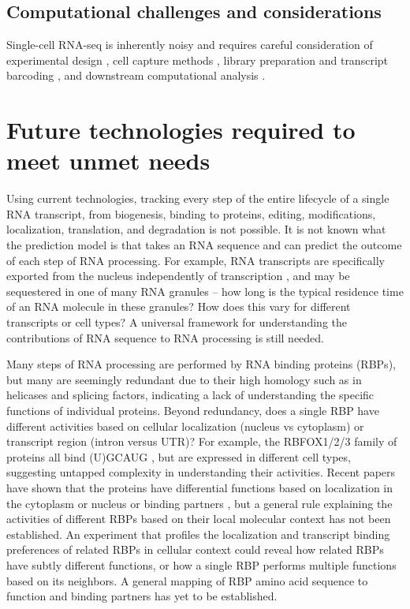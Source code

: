 \subsection{Computational challenges and considerations}

Single-cell RNA-seq is inherently noisy and requires careful consideration of experimental design \cite{Bacher2016-ze}, cell capture methods \cite{Ziegenhain2016-gb}, library preparation and transcript barcoding \cite{Ziegenhain2016-gb,Kivioja2011-dp}, and downstream computational analysis \cite{Stegle2015-tl}.


\section{Future technologies required to meet unmet needs}

Using current technologies, tracking every step of the entire lifecycle of a single RNA transcript, from biogenesis, binding to proteins, editing, modifications, localization, translation, and degradation is not possible. It is not known what the prediction model is that takes an RNA sequence and can predict the outcome of each step of RNA processing. For example, RNA transcripts are specifically exported from the nucleus independently of transcription \cite{Nakielny1997-ut,Ohno2012-yw,Siddiqui2012-mv,Strasser2002-xc}, and may be sequestered in one of many RNA granules \cite{Anderson2009-dd,Anderson2006-qf,Blower2013-aj,Kiebler2006-xo,Thomas2011-ha} -- how long is the typical residence time of an RNA molecule in these granules? How does this vary for different transcripts or cell types? A universal framework for understanding the contributions of RNA sequence to RNA processing is still needed.

Many steps of RNA processing are performed by RNA binding proteins (RBPs), but many are seemingly redundant due to their high homology such as in helicases and splicing factors, indicating a lack of understanding the specific functions of individual proteins. Beyond redundancy, does a single RBP have different activities based on cellular localization (nucleus vs cytoplasm) or transcript region (intron versus UTR)? For example, the RBFOX1/2/3 family of proteins all bind (U)GCAUG \cite{Damianov2016-pa,Dredge2011-bk,Weyn-Vanhentenryck2014-vt,Lovci2013-fr,Nutter2016-nu}, but are expressed in different cell types, suggesting untapped complexity in understanding their activities. Recent papers have shown that the proteins have differential functions based on localization in the cytoplasm or nucleus \cite{Dredge2011-bk} or binding partners \cite{Damianov2016-pa}, but a general rule explaining the activities of different RBPs based on their local molecular context has not been established. An experiment that profiles the localization and transcript binding preferences of related RBPs in cellular context could reveal how related RBPs have subtly different functions, or how a single RBP performs multiple functions based on its neighbors. A general mapping of RBP amino acid sequence to function and binding partners has yet to be established.

